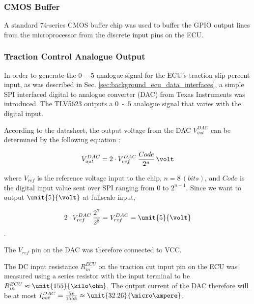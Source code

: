 \subsubsection{CMOS Buffer}

A standard 74-series CMOS buffer chip was used to buffer the GPIO output lines from the microprocessor from the discrete input pins on the ECU.

\subsubsection{Traction Control Analogue Output}

In order to generate the \unit{0-5}{\volt} analogue signal for the ECU's traction slip percent input, as was described in Sec. \ref{sec:background_ecu_data_interfaces}, a simple SPI interfaced digital to analogue converter (DAC) from Texas Instruments was introduced. The TLV5623 outputs a \unit{0-5}{\volt} analogue signal that varies with the digital input.

According to the datasheet, the output voltage from the DAC $V_{out}^{DAC}$ can be determined by the following equation \cite{TLV5623}:

\begin{equation}
V_{out}^{DAC}=2\cdot{V_{ref}^{DAC}}\,\frac{Code}{2^{n}}\,\volt
\end{equation}

where $V_{ref}$ is the reference voltage input to the chip, $n=8\,(bits)$, and $Code$ is the digital input value sent over SPI ranging from $0$ to $2^{n-1}$. Since we want to output $\unit{5}{\volt}$ at fullscale input,

\begin{equation}
2\cdot{V_{ref}^{DAC}}\,\frac{2^{7}}{2^{8}}=V_{ref}^{DAC}=\unit{5}{\volt}
\end{equation}.

The $V_{ref}$ pin on the DAC was therefore connected to VCC.

The DC input resistance $R_{in}^{ECU}$ on the traction cut input pin on the ECU was measured using a series resistor with the input terminal to be $R_{in}^{ECU}\approx\unit{155}{\kilo\ohm}$. The output current of the DAC therefore will be at most $I_{out}^{DAC}=\frac{5v}{155k}\approx\unit{32.26}{\micro\ampere}$.

